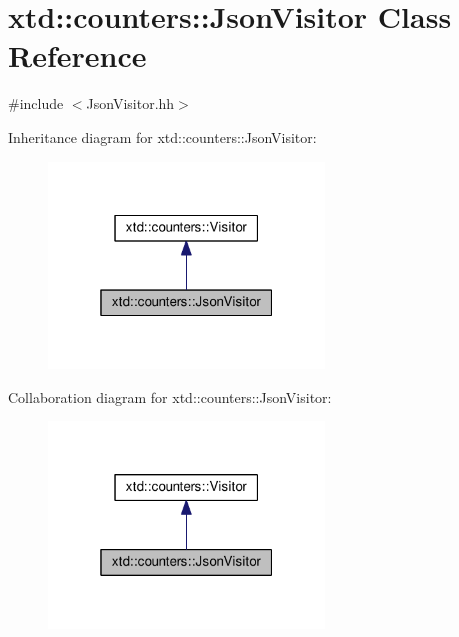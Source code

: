 \hypertarget{classxtd_1_1counters_1_1JsonVisitor}{\section{xtd\-:\-:counters\-:\-:Json\-Visitor Class Reference}
\label{classxtd_1_1counters_1_1JsonVisitor}
}


{\ttfamily \#include $<$Json\-Visitor.\-hh$>$}



Inheritance diagram for xtd\-:\-:counters\-:\-:Json\-Visitor\-:
\nopagebreak
\begin{figure}[H]
\begin{center}
\leavevmode
\includegraphics[width=208pt]{classxtd_1_1counters_1_1JsonVisitor__inherit__graph}
\end{center}
\end{figure}


Collaboration diagram for xtd\-:\-:counters\-:\-:Json\-Visitor\-:
\nopagebreak
\begin{figure}[H]
\begin{center}
\leavevmode
\includegraphics[width=208pt]{classxtd_1_1counters_1_1JsonVisitor__coll__graph}
\end{center}
\end{figure}
